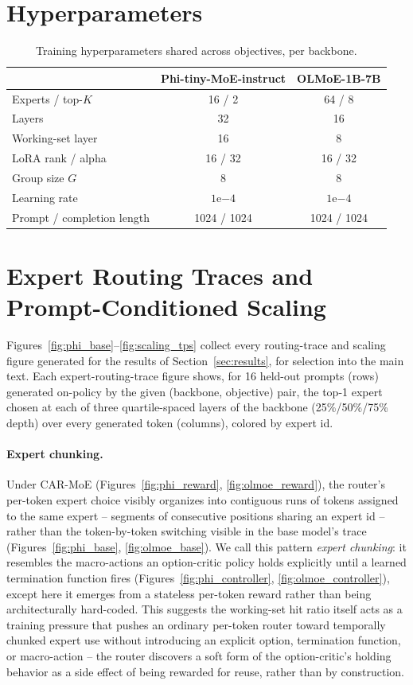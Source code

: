 \documentclass{article}
\begin{document}
\section{Hyperparameters}
\label{app:hparams}

\begin{table}[h]
\centering
\caption{Training hyperparameters shared across objectives, per backbone.}
\begin{tabular}{lcc}
\toprule
 & Phi-tiny-MoE-instruct & OLMoE-1B-7B \\
\midrule
Experts / top-$K$ & 16 / 2 & 64 / 8 \\
Layers & 32 & 16 \\
Working-set layer & 16 & 8 \\
LoRA rank / alpha & 16 / 32 & 16 / 32 \\
Group size $G$ & 8 & 8 \\
Learning rate & $1\mathrm{e}{-4}$ & $1\mathrm{e}{-4}$ \\
Prompt / completion length & 1024 / 1024 & 1024 / 1024 \\
\bottomrule
\end{tabular}
\end{table}

\section{Expert Routing Traces and Prompt-Conditioned Scaling}
\label{app:figures}

Figures~\ref{fig:phi_base}--\ref{fig:scaling_tps} collect every routing-trace and
scaling figure generated for the results of Section~\ref{sec:results}, for selection into
the main text. Each expert-routing-trace figure shows, for 16 held-out prompts (rows)
generated on-policy by the given (backbone, objective) pair, the top-1 expert chosen at
each of three quartile-spaced layers of the backbone (25\%/50\%/75\% depth) over every
generated token (columns), colored by expert id.

\paragraph{Expert chunking.} Under CAR-MoE (Figures~\ref{fig:phi_reward},
\ref{fig:olmoe_reward}), the router's per-token expert choice visibly organizes into
contiguous runs of tokens assigned to the same expert -- segments of consecutive
positions sharing an expert id -- rather than the token-by-token switching visible in the
base model's trace (Figures~\ref{fig:phi_base}, \ref{fig:olmoe_base}). We call this
pattern \emph{expert chunking}: it resembles the macro-actions an option-critic policy
holds explicitly until a learned termination function fires
(Figures~\ref{fig:phi_controller}, \ref{fig:olmoe_controller}), except here it emerges
from a stateless per-token reward rather than being architecturally hard-coded. This
suggests the working-set hit ratio itself acts as a training pressure that pushes an
ordinary per-token router toward temporally chunked expert use without introducing an
explicit option, termination function, or macro-action -- the router discovers a soft
form of the option-critic's holding behavior as a side effect of being rewarded for
reuse, rather than by construction.
\end{document}
